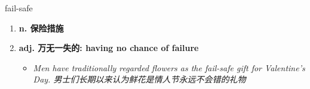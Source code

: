
\begin{frame}
{\huge fail-safe}
\begin{center}
\begin{enumerate}\Large
  \item \textbf{n. 保险措施}
  \item \textbf{adj. 万无一失的: having no chance of failure}
  \begin{itemize}
    \item \em{\Large{Men have traditionally regarded flowers as the fail-safe gift for Valentine's Day. 男士们长期以来认为鲜花是情人节永远不会错的礼物}}
  \end{itemize}
\end{enumerate}
\end{center}
\end{frame}
